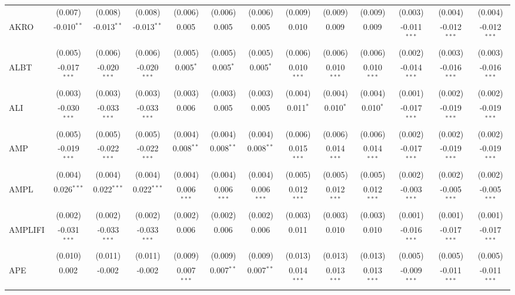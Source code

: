 \begin{table}[!htbp]
\begin{tabular}{@{\extracolsep{5pt}}lcccccccccccc}
  & (0.007) & (0.008) & (0.008) & (0.006) & (0.006) & (0.006) & (0.009) & (0.009) & (0.009) & (0.003) & (0.004) & (0.004) \\
 AKRO & -0.010$^{**}$ & -0.013$^{**}$ & -0.013$^{**}$ & 0.005$^{}$ & 0.005$^{}$ & 0.005$^{}$ & 0.010$^{}$ & 0.009$^{}$ & 0.009$^{}$ & -0.011$^{***}$ & -0.012$^{***}$ & -0.012$^{***}$ \\
  & (0.005) & (0.006) & (0.006) & (0.005) & (0.005) & (0.005) & (0.006) & (0.006) & (0.006) & (0.002) & (0.003) & (0.003) \\
 ALBT & -0.017$^{***}$ & -0.020$^{***}$ & -0.020$^{***}$ & 0.005$^{*}$ & 0.005$^{*}$ & 0.005$^{*}$ & 0.010$^{***}$ & 0.010$^{***}$ & 0.010$^{***}$ & -0.014$^{***}$ & -0.016$^{***}$ & -0.016$^{***}$ \\
  & (0.003) & (0.003) & (0.003) & (0.003) & (0.003) & (0.003) & (0.004) & (0.004) & (0.004) & (0.001) & (0.002) & (0.002) \\
 ALI & -0.030$^{***}$ & -0.033$^{***}$ & -0.033$^{***}$ & 0.006$^{}$ & 0.005$^{}$ & 0.005$^{}$ & 0.011$^{*}$ & 0.010$^{*}$ & 0.010$^{*}$ & -0.017$^{***}$ & -0.019$^{***}$ & -0.019$^{***}$ \\
  & (0.005) & (0.005) & (0.005) & (0.004) & (0.004) & (0.004) & (0.006) & (0.006) & (0.006) & (0.002) & (0.002) & (0.002) \\
 AMP & -0.019$^{***}$ & -0.022$^{***}$ & -0.022$^{***}$ & 0.008$^{**}$ & 0.008$^{**}$ & 0.008$^{**}$ & 0.015$^{***}$ & 0.014$^{***}$ & 0.014$^{***}$ & -0.017$^{***}$ & -0.019$^{***}$ & -0.019$^{***}$ \\
  & (0.004) & (0.004) & (0.004) & (0.004) & (0.004) & (0.004) & (0.005) & (0.005) & (0.005) & (0.002) & (0.002) & (0.002) \\
 AMPL & 0.026$^{***}$ & 0.022$^{***}$ & 0.022$^{***}$ & 0.006$^{***}$ & 0.006$^{***}$ & 0.006$^{***}$ & 0.012$^{***}$ & 0.012$^{***}$ & 0.012$^{***}$ & -0.003$^{***}$ & -0.005$^{***}$ & -0.005$^{***}$ \\
  & (0.002) & (0.002) & (0.002) & (0.002) & (0.002) & (0.002) & (0.003) & (0.003) & (0.003) & (0.001) & (0.001) & (0.001) \\
 AMPLIFI & -0.031$^{***}$ & -0.033$^{***}$ & -0.033$^{***}$ & 0.006$^{}$ & 0.006$^{}$ & 0.006$^{}$ & 0.011$^{}$ & 0.010$^{}$ & 0.010$^{}$ & -0.016$^{***}$ & -0.017$^{***}$ & -0.017$^{***}$ \\
  & (0.010) & (0.011) & (0.011) & (0.009) & (0.009) & (0.009) & (0.013) & (0.013) & (0.013) & (0.005) & (0.005) & (0.005) \\
 APE & 0.002$^{}$ & -0.002$^{}$ & -0.002$^{}$ & 0.007$^{***}$ & 0.007$^{**}$ & 0.007$^{**}$ & 0.014$^{***}$ & 0.013$^{***}$ & 0.013$^{***}$ & -0.009$^{***}$ & -0.011$^{***}$ & -0.011$^{***}$ \\

\end{tabular}
\end{table}
